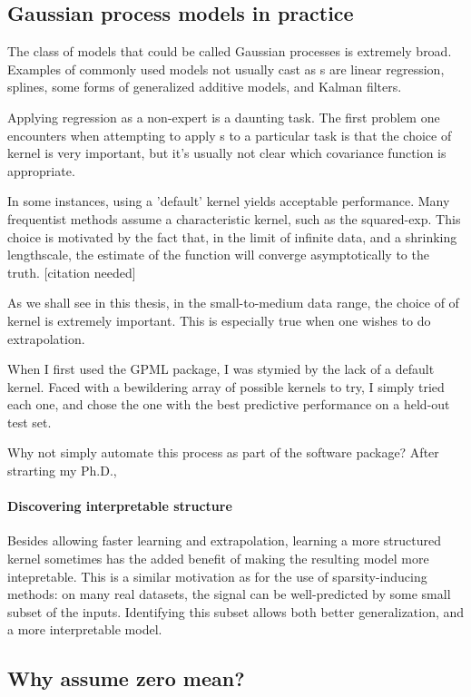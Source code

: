 \subsection{Gaussian process models in practice}

The class of models that could be called Gaussian processes is extremely broad.
Examples of commonly used models not usually cast as \gp{}s are linear regression, splines, some forms of generalized additive models, and Kalman filters.

Applying \gp{} regression as a non-expert is a daunting task.
The first problem one encounters when attempting to apply \gp{}s to a particular task is that the choice of kernel is very important, but it's usually not clear which covariance function is appropriate.

In some instances, using a 'default' kernel yields acceptable performance.
Many frequentist methods assume a characteristic kernel, such as the squared-exp.
This choice is motivated by the fact that, in the limit of infinite data, and a shrinking lengthscale, the estimate of the function will converge asymptotically to the truth. [citation needed]

As we shall see in this thesis, in the small-to-medium data range, the choice of of kernel is extremely important.
This is especially true when one wishes to do extrapolation.

When I first used the GPML package, I was stymied by the lack of a default kernel.
Faced with a bewildering array of possible kernels to try, I simply tried each one, and chose the one with the best predictive performance on a held-out test set.

Why not simply automate this process as part of the software package?
After strarting my Ph.D., 


\paragraph{Discovering interpretable structure}
Besides allowing faster learning and extrapolation, learning a more structured kernel sometimes has the added benefit of making the resulting model more intepretable.
This is a similar motivation as for the use of sparsity-inducing methods:  on many real datasets, the signal can be well-predicted by some small subset of the inputs.  Identifying this subset allows both better generalization, and a more interpretable model.




\subsection{Why assume zero mean?}

